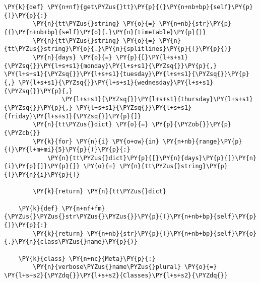 \begin{Verbatim}[commandchars=\\\{\}]
    \PY{k}{def} \PY{n+nf}{get\PYZus{}tt}\PY{p}{(}\PY{n+nb+bp}{self}\PY{p}{)}\PY{p}{:}
        \PY{n}{tt\PYZus{}string} \PY{o}{=} \PY{n+nb}{str}\PY{p}{(}\PY{n+nb+bp}{self}\PY{o}{.}\PY{n}{timeTable}\PY{p}{)}
        \PY{n}{tt\PYZus{}string} \PY{o}{=} \PY{n}{tt\PYZus{}string}\PY{o}{.}\PY{n}{splitlines}\PY{p}{(}\PY{p}{)}
        \PY{n}{days} \PY{o}{=} \PY{p}{[}\PY{l+s+s1}{\PYZsq{}}\PY{l+s+s1}{monday}\PY{l+s+s1}{\PYZsq{}}\PY{p}{,} \PY{l+s+s1}{\PYZsq{}}\PY{l+s+s1}{tuesday}\PY{l+s+s1}{\PYZsq{}}\PY{p}{,} \PY{l+s+s1}{\PYZsq{}}\PY{l+s+s1}{wednesday}\PY{l+s+s1}{\PYZsq{}}\PY{p}{,}
                \PY{l+s+s1}{\PYZsq{}}\PY{l+s+s1}{thursday}\PY{l+s+s1}{\PYZsq{}}\PY{p}{,} \PY{l+s+s1}{\PYZsq{}}\PY{l+s+s1}{friday}\PY{l+s+s1}{\PYZsq{}}\PY{p}{]}
        \PY{n}{tt\PYZus{}dict} \PY{o}{=} \PY{p}{\PYZob{}}\PY{p}{\PYZcb{}}
        \PY{k}{for} \PY{n}{i} \PY{o+ow}{in} \PY{n+nb}{range}\PY{p}{(}\PY{l+m+mi}{5}\PY{p}{)}\PY{p}{:}
            \PY{n}{tt\PYZus{}dict}\PY{p}{[}\PY{n}{days}\PY{p}{[}\PY{n}{i}\PY{p}{]}\PY{p}{]} \PY{o}{=} \PY{n}{tt\PYZus{}string}\PY{p}{[}\PY{n}{i}\PY{p}{]}

        \PY{k}{return} \PY{n}{tt\PYZus{}dict}

    \PY{k}{def} \PY{n+nf+fm}{\PYZus{}\PYZus{}str\PYZus{}\PYZus{}}\PY{p}{(}\PY{n+nb+bp}{self}\PY{p}{)}\PY{p}{:}
        \PY{k}{return} \PY{n+nb}{str}\PY{p}{(}\PY{n+nb+bp}{self}\PY{o}{.}\PY{n}{class\PYZus{}name}\PY{p}{)}

    \PY{k}{class} \PY{n+nc}{Meta}\PY{p}{:}
        \PY{n}{verbose\PYZus{}name\PYZus{}plural} \PY{o}{=} \PY{l+s+s2}{\PYZdq{}}\PY{l+s+s2}{Classes}\PY{l+s+s2}{\PYZdq{}}
\end{Verbatim}
